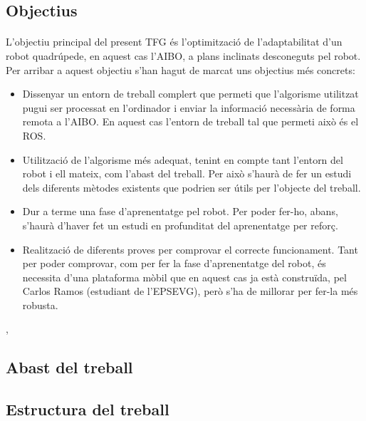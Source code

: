\documentclass[12pt,a4paper,final,twoside]{article}
\begin{document}
\label{Objectius}
\subsection*{Objectius}

\paragraph{}L'objectiu principal del present TFG és l'optimització de l'adaptabilitat d'un robot quadrúpede, en aquest cas l'AIBO, a plans inclinats desconeguts pel robot. Per arribar a aquest objectiu s'han hagut de marcat uns objectius més concrets:
\begin{itemize}
\item Dissenyar un entorn de treball complert que permeti que l'algorisme utilitzat pugui ser processat en l'ordinador i enviar la informació necessària de forma remota a l'AIBO. En aquest cas l'entorn de treball tal que permeti això és el ROS.
\item Utilització de l'algorisme més adequat, tenint en compte tant l'entorn del robot i ell mateix, com l'abast del treball. Per això s'haurà de fer un estudi dels diferents mètodes existents que podrien ser útils per l'objecte del treball.
\item Dur a terme una fase d'aprenentatge pel robot. Per poder fer-ho, abans, s'haurà d'haver fet un estudi en profunditat del aprenentatge per reforç.
\item Realització de diferents proves per comprovar el correcte funcionament. Tant per poder comprovar, com per fer la fase d'aprenentatge del robot, és necessita d'una plataforma mòbil que en aquest cas ja està construïda, pel Carlos Ramos (estudiant de l'EPSEVG)\cite{TFG_Carlos_Ramos}, però s'ha de millorar per fer-la més robusta.
\end{itemize},


\label{Abast}
\subsection*{Abast del treball}

\label{Estructura}
\subsection*{Estructura del treball}
\end{document}
